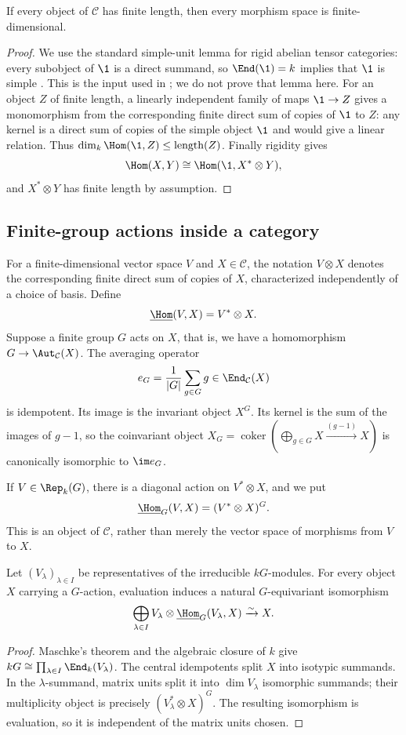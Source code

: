 \begin{lemma}
If every object of $\mathcal C$ has finite length, then every morphism
space is finite-dimensional.
\end{lemma}
\begin{proof}
We use the standard simple-unit lemma for rigid abelian tensor
categories: every subobject of $\1$ is a direct summand, so
$\End(\1)=k$ implies that $\1$ is simple
\cite[Proposition 1.17]{DMTannakian}. This is the input used in
\cite[Proposition 1.1]{Deligne2002}; we do not prove that lemma here.
For an object $Z$ of finite length, a linearly independent family of
maps $\1\to Z$ gives a monomorphism from the corresponding finite
direct sum of copies of $\1$ to $Z$: any kernel is a direct sum of
copies of the simple object $\1$ and would give a linear relation.
Thus $\dim_k\Hom(\1,Z)\leq\operatorname{length}(Z)$.
Finally rigidity gives
\[
 \Hom(X,Y)\cong\Hom(\1,X^*\otimes Y),
\]
and $X^*\otimes Y$ has finite length by assumption.
\end{proof}

\subsection{Finite-group actions inside a category}

For a finite-dimensional vector space $V$ and $X\in\mathcal C$, the
notation $V\otimes X$ denotes the corresponding finite direct sum of
copies of $X$, characterized independently of a choice of basis.
Define
\[
 \underline{\Hom}(V,X)=V^*\otimes X.
\]
Suppose a finite group $G$ acts on $X$, that is, we have a homomorphism
$G\to\Aut_{\mathcal C}(X)$. The averaging operator
\[
 e_G=\frac1{|G|}\sum_{g\in G}g\in\End_{\mathcal C}(X)
\]
is idempotent. Its image is the invariant object $X^G$. Its kernel is
the sum of the images of $g-1$, so the coinvariant object
$X_G=\operatorname{coker}(\bigoplus_{g\in G}X\xrightarrow{(g-1)}X)$
is canonically isomorphic to $\im e_G$.

If $V\in\Rep_k(G)$, there is a diagonal action on $V^*\otimes X$,
and we put
\[
 \underline{\Hom}_G(V,X)=(V^*\otimes X)^G.
\]
This is an object of $\mathcal C$, rather than merely the vector space
of morphisms from $V$ to $X$.

\begin{proposition}
Let $(V_\lambda)_{\lambda\in I}$ be representatives of the irreducible
$kG$-modules. For every object $X$ carrying a $G$-action, evaluation
induces a natural $G$-equivariant isomorphism
\[
 \bigoplus_{\lambda\in I}
 V_\lambda\otimes\underline{\Hom}_G(V_\lambda,X)
       \xrightarrow{\sim}X.
\]
\end{proposition}
\begin{proof}
Maschke's theorem and the algebraic closure of $k$ give
$kG\cong\prod_{\lambda\in I}\End_k(V_\lambda)$.
The central idempotents split $X$ into isotypic summands. In the
$\lambda$-summand, matrix units split it into $\dim V_\lambda$
isomorphic summands; their multiplicity object is precisely
$(V_\lambda^*\otimes X)^G$. The resulting isomorphism is evaluation,
so it is independent of the matrix units chosen.
\end{proof}


